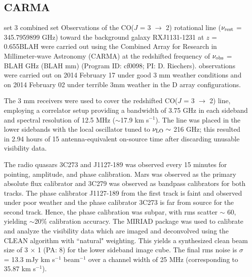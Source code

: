 \documentclass[]{emulateapj}
\begin{document}
\subsection{CARMA} \label{sec:carmadata}
set 3
combined set
%
Observations of the CO($J$ = 3 $\rightarrow$ 2) rotational line ($\nu_{\rm
rest}$ = 345.7959899 GHz) toward the background galaxy RXJ1131-1231 at $z$ = 
0.655BLAH 
 were carried out using the Combined Array for Research in Millimeter-wave
Astronomy (CARMA) at the redshifted frequency of $\nu_{\rm obs}$ = BLAH GHz
(BLAH mm) (Program ID: cf0098; PI: D. Riechers).
observations were carried out on 2014 February 17 under good 3 mm weather
conditions and on 2014 February 02 under terrible 3mm weather in the D array
configurations. 

The 3 mm receivers were used to cover
the 
redshifted CO($J$ = 3 $\rightarrow$ 2) line, employing a correlator setup
providing a bandwidth of 3.75 GHz in each sideband and spectral resolution of
12.5 MHz ($
\sim$17.9 km s$^{-1}$). The line was placed in the
lower sidebands with the local oscillator tuned to $\nu_{\rm LO}\sim$ 216 GHz;
this resulted in 2.94 hours of 15 antenna-equivalent on-source time after
discarding 
unusable visibility data. 

The radio quasars 3C273 and J1127-189 was observed every 15 minutes for
pointing, amplitude, and phase calibration. Mars was observed as the
primary
absolute flux calibrator and 3C279 was observed as bandpass calibrators for
both tracks. 
The phase calibrator J1127-189 from the first track is faint and observed under
poor weather and the phase calibrator 3C273 is far from source for the second
track. Hence, the phase calibration was 
subpar, with rms scatter $\sim$ 60\degr, 
yielding
$\sim
$20\% calibration accuracy.
The MIRIAD package was used to calibrate and analyze the visibility data which
are imaged and deconvolved using
the CLEAN algorithm with ``natural" weighting. This yields a synthesized clean
beam size of 3 $\times$ 1 (PA: 8\degr) for the lower sideband
image cube. The
final 
rms noise is $\sigma$ = 13.3 mJy km s$^{-1}$ beam$^{-1}$ over a channel width
of
25 MHz (corresponding to 35.87 km s$^{-1}$). 
\end{document}
